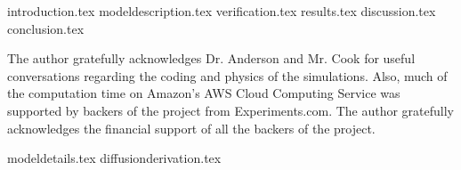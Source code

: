 \documentclass[%
reprint,
 amsmath,amssymb,
 aps,
pra,
floatfix,
]{revtex4-1}
\begin{document}
\maketitle


{introduction.tex}
{modeldescription.tex}
{verification.tex}
{results.tex}
{discussion.tex}
{conclusion.tex}
\begin{acknowledgments}
The author gratefully acknowledges Dr. Anderson and Mr. Cook for useful conversations regarding the coding and physics of the simulations. Also, much of the computation time on Amazon's AWS Cloud Computing Service was supported by backers of the project from Experiments.com. The author gratefully acknowledges the financial support of all the backers of the project.
\end{acknowledgments}

\appendix
{modeldetails.tex}
{diffusionderivation.tex}



\end{document}
